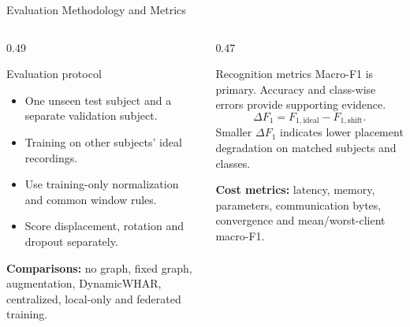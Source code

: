 \documentclass[10pt,aspectratio=169]{beamer}
\begin{document}
\begin{frame}[t]{Evaluation Methodology and Metrics}
\begin{columns}[T,onlytextwidth]
\begin{column}{0.49\textwidth}
\begin{block}{Evaluation protocol}
\begin{itemize}
\item One unseen test subject and a separate validation subject.
\item Training on other subjects' ideal recordings.
\item Use training-only normalization and common window rules.
\item Score displacement, rotation and dropout separately.
\end{itemize}
\end{block}
\textbf{Comparisons:} no graph, fixed graph, augmentation, DynamicWHAR, centralized, local-only and federated training.
\end{column}
\begin{column}{0.47\textwidth}
\begin{block}{Recognition metrics}
Macro-F1 is primary. Accuracy and class-wise errors provide supporting evidence.
\[
\Delta F_1=F_{1,\mathrm{ideal}}-F_{1,\mathrm{shift}}.
\]
Smaller $\Delta F_1$ indicates lower placement degradation on matched subjects and classes.
\end{block}
\textbf{Cost metrics:} latency, memory, parameters, communication bytes, convergence and mean/worst-client macro-F1.
\end{column}
\end{columns}
\end{frame}
\end{document}
